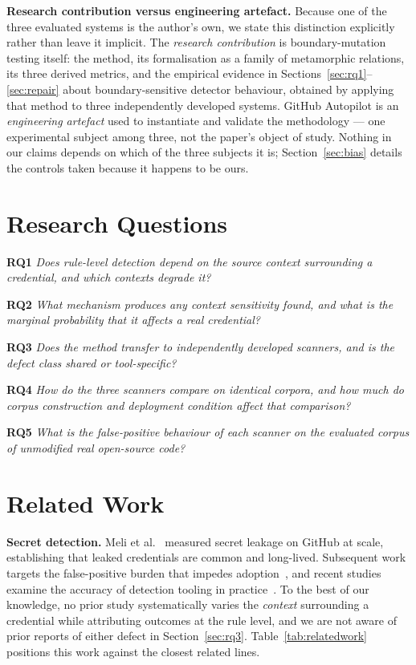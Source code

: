 \documentclass[journal]{IEEEtran}
\newcommand{\researchq}[1]{\textbf{RQ#1}}
\begin{document}
\medskip\noindent\textbf{Research contribution versus engineering artefact.} Because one of the three evaluated systems is the author's own, we state this distinction explicitly rather than leave it implicit. The \emph{research contribution} is boundary-mutation testing itself: the method, its formalisation as a family of metamorphic relations, its three derived metrics, and the empirical evidence in Sections~\ref{sec:rq1}--\ref{sec:repair} about boundary-sensitive detector behaviour, obtained by applying that method to three independently developed systems. GitHub Autopilot is an \emph{engineering artefact} used to instantiate and validate the methodology --- one experimental subject among three, not the paper's object of study. Nothing in our claims depends on which of the three subjects it is; Section~\ref{sec:bias} details the controls taken because it happens to be ours.

\section{Research Questions}

\noindent\researchq{1} \emph{Does rule-level detection depend on the source context surrounding a credential, and which contexts degrade it?}

\noindent\researchq{2} \emph{What mechanism produces any context sensitivity found, and what is the marginal probability that it affects a real credential?}

\noindent\researchq{3} \emph{Does the method transfer to independently developed scanners, and is the defect class shared or tool-specific?}

\noindent\researchq{4} \emph{How do the three scanners compare on identical corpora, and how much do corpus construction and deployment condition affect that comparison?}

\noindent\researchq{5} \emph{What is the false-positive behaviour of each scanner on the evaluated corpus of unmodified real open-source code?}

\section{Related Work}

\textbf{Secret detection.} Meli et al.~\cite{meli2019} measured secret leakage on GitHub at scale, establishing that leaked credentials are common and long-lived. Subsequent work targets the false-positive burden that impedes adoption~\cite{saha2020,rahman2019}, and recent studies examine the accuracy of detection tooling in practice~\cite{basak2022}. To the best of our knowledge, no prior study systematically varies the \emph{context} surrounding a credential while attributing outcomes at the rule level, and we are not aware of prior reports of either defect in Section~\ref{sec:rq3}. Table~\ref{tab:relatedwork} positions this work against the closest related lines.
\end{document}
